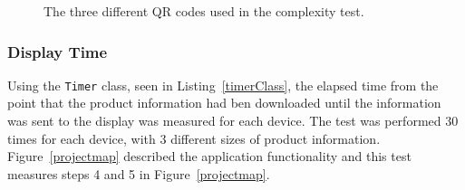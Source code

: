 	\begin{figure}[H]%
		\centering
   		 \qquad
   		 \qquad
   		 \qquad
		\caption{The three different QR codes used in the complexity test.}
		\label{qrCodeComplex}
	\end{figure}

%       
%		

\subsubsection{Display Time}

Using the \texttt{Timer} class, seen in Listing~\ref{timerClass}, the elapsed time from the point that the product information had ben downloaded until the information was sent to the display was measured for each device. The test was performed 30 times for each device, with 3 different sizes of product information. Figure~\ref{projectmap} described the application functionality and this test measures steps 4 and 5 in Figure~\ref{projectmap}. %

